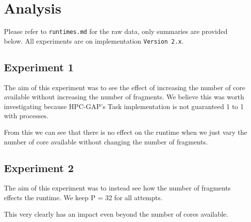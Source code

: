 \documentclass{report}
\begin{document}
\section*{Analysis}
Please refer to \texttt{runtimes.md} for the raw data, only summaries are provided below.
\newline
All experiments are on implementation \texttt{Version 2.x}.

\subsection*{Experiment 1}
The aim of this experiment was to see the effect of increasing the number of core available without increasing the number of fragments.
\newline
We believe this was worth investigating because HPC-GAP's Task implementation is not guaranteed 1 to 1 with processes.
\newline
{}

From this we can see that there is no effect on the runtime when we just vary the number of core available without changing the number of fragments.

\subsection*{Experiment 2}
The aim of this experiment was to instead see how the number of fragments effects the runtime. We keep P = 32 for all attempts.
\newline
{}
This very clearly has an impact even beyond the number of cores available. 
\end{document}
